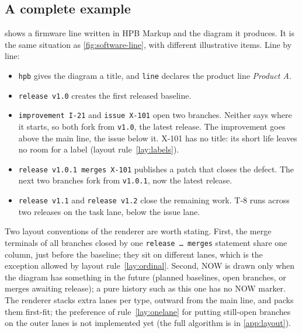 \subsection{A complete example}
\label{sec:tooling-example}

 shows a firmware line written in HPB Markup and
the diagram it produces. It is the same situation as
\cref{fig:software-line}, with different illustrative items. Line by line:

\begin{itemize}[leftmargin=1.5em,itemsep=1pt,topsep=3pt]
  \item \texttt{hpb} gives the diagram a title, and \texttt{line} declares
        the product line \emph{Product A}.
  \item \texttt{release v1.0} creates the first released baseline.
  \item \texttt{improvement I-21} and \texttt{issue X-101} open two
        branches. Neither says where it starts, so both fork from
        \texttt{v1.0}, the latest release. The improvement goes above the
        main line, the issue below it. X-101 has no title: its short life
        leaves no room for a label (layout rule~\ref{lay:labels}).
  \item \texttt{release v1.0.1 merges X-101} publishes a patch that closes
        the defect. The next two branches fork from \texttt{v1.0.1}, now
        the latest release.
  \item \texttt{release v1.1} and \texttt{release v1.2} close the remaining
        work. T-8 runs across two releases on the task lane, below the
        issue lane.
\end{itemize}

\noindent Two layout conventions of the renderer are worth stating. First,
the merge terminals of all branches closed by one
\texttt{release \dots{} merges} statement share one column, just before
the baseline; they sit on different lanes, which is the exception allowed
by layout rule~\ref{lay:ordinal}. Second, NOW is drawn only when the
diagram has something in the future (planned baselines, open branches, or
merges awaiting release); a pure history such as this one has no NOW
marker. The renderer stacks extra lanes per type, outward from the main
line, and packs them first-fit; the preference of
rule~\ref{lay:onelane} for putting still-open branches on the outer lanes
is not implemented yet (the full algorithm is in \cref{app:layout}).

